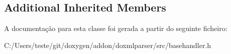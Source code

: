 \subsection*{Additional Inherited Members}


A documentação para esta classe foi gerada a partir do seguinte ficheiro\-:\begin{DoxyCompactItemize}
\item 
C\-:/\-Users/teste/git/doxygen/addon/doxmlparser/src/basehandler.\-h\end{DoxyCompactItemize}
